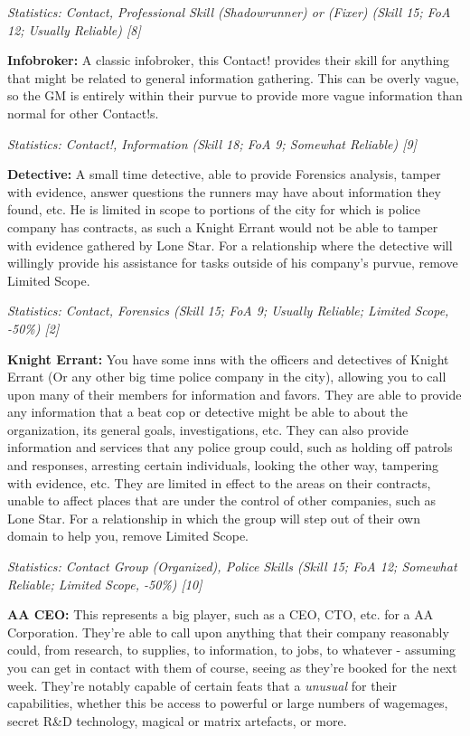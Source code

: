 \begin{multicols*}{2}
	\textit{\textcolor{OliveGreen}{Statistics: Contact, Professional Skill (Shadowrunner) or (Fixer) (Skill 15; FoA 12; Usually Reliable) [8]}}
	
	\textbf{Infobroker:} A classic infobroker, this Contact! provides their skill for anything that might be related to general information gathering. This can be overly vague, so the GM is entirely within their purvue to provide more vague information than normal for other Contact!s.
	
	\textit{\textcolor{OliveGreen}{Statistics: Contact!, Information (Skill 18; FoA 9; Somewhat Reliable) [9]}}
	
	\textbf{Detective:} A small time detective, able to provide Forensics analysis, tamper with evidence, answer questions the runners may have about information they found, etc. He is limited in scope to portions of the city for which is police company has contracts, as such a Knight Errant would not be able to tamper with evidence gathered by Lone Star. For a relationship where the detective will willingly provide his assistance for tasks outside of his company's purvue, remove Limited Scope.
	
	\textit{\textcolor{OliveGreen}{Statistics: Contact, Forensics (Skill 15; FoA 9; Usually Reliable; Limited Scope, -50\%) [2]}}
	
	\textbf{Knight Errant:} You have some inns with the officers and detectives of Knight Errant (Or any other big time police company in the city), allowing you to call upon many of their members for information and favors. They are able to provide any information that a beat cop or detective might be able to about the organization, its general goals, investigations, etc. They can also provide information and services that any police group could, such as holding off patrols and responses, arresting certain individuals, looking the other way, tampering with evidence, etc. They are limited in effect to the areas on their contracts, unable to affect places that are under the control of other companies, such as Lone Star. For a relationship in which the group will step out of their own domain to help you, remove Limited Scope.
	
	\textit{\textcolor{OliveGreen}{Statistics: Contact Group (Organized), Police Skills (Skill 15; FoA 12; Somewhat Reliable; Limited Scope, -50\%) [10]}}
	
	\textbf{AA CEO:} This represents a big player, such as a CEO, CTO, etc. for a AA Corporation. They're able to call upon anything that their company reasonably could, from research, to supplies, to information, to jobs, to whatever - assuming you can get in contact with them of course, seeing as they're booked for the next week. They're notably capable of certain feats that a \textit{unusual} for their capabilities, whether this be access to powerful or large numbers of wagemages, secret R\&D technology, magical or matrix artefacts, or more.
	

\end{multicols*}
